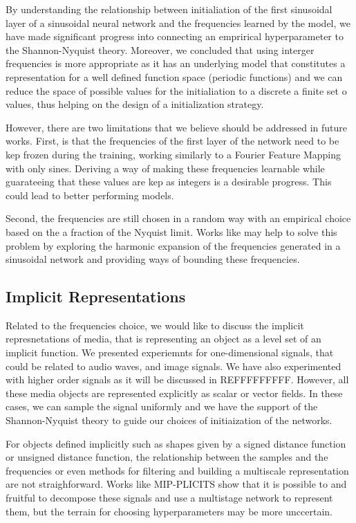 By understanding the relationship between initialiation of the first sinusoidal layer of a sinusoidal neural network and the frequencies learned by the model, we have made significant progress into connecting an emprirical hyperparameter to the Shannon-Nyquist theory. Moreover, we concluded that using interger frequencies is more appropriate as it has an underlying model that constitutes a representation for a well defined function space (periodic functions) and we can reduce the space of possible values for the initialiation to a discrete a finite set o values, thus helping on the design of a initialization strategy. 

However, there are two limitations that we believe should be addressed in future works. First, is that the frequencies of the first layer of the network need to be kep frozen during the training, working similarly to a Fourier Feature Mapping with only sines. Deriving a way of making these frequencies learnable while guarateeing that these values are kep as integers is a desirable progress. This could lead to better performing models.

Second, the frequencies are still chosen in a random way with an empirical choice based on the a fraction of the Nyquist limit. Works like \cite{tamingFactory} may help to solve this problem by exploring the harmonic expansion of the frequencies generated in a sinusoidal network and providing ways of bounding these frequencies.

\subsection{Implicit Representations}

Related to the frequencies choice, we would like to discuss the implicit represnetations of media, that is representing an object as a level set of an implicit function. We presented experiemnts for one-dimensional signals, that could be related to audio waves, and image signals. We have also experimented with higher order signals as it will be discussed in REFFFFFFFFF. However, all these media objects are represented explicitly as scalar or vector fields. In these cases, we can sample the signal uniformly and we have the support of the Shannon-Nyquist theory to guide our choices of initiaization of the networks.

For objects defined implicitly such as shapes given by a signed distance function or unsigned distance function, the relationship between the samples and the frequencies or even methods for filtering and building a multiscale representation are not straighforward. Works like MIP-PLICITS show that it is possible to and fruitful to decompose these signals and use a multistage network to represent them, but the terrain for choosing hyperparameters may be more unccertain.

